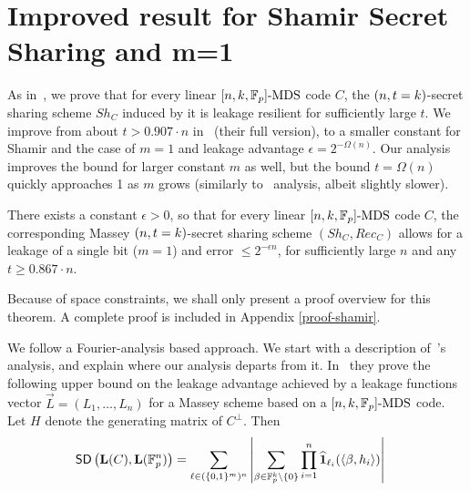 \chapter{Improved result for Shamir Secret Sharing and m=1}
\label{sec:shamir} 

As in~\cite{EPRINT:BDIR19}, we prove that for every linear $[n,k,\mathbb{F}_p]\text{-MDS}$ code $C$, the $(n,t=k)$-secret sharing scheme $Sh_C$ induced by it is leakage resilient for sufficiently large $t$.
We improve from about $t> 0.907\cdot n$ in~\cite{EPRINT:BDIR19} (their full version), to a smaller constant for Shamir and the case of $m=1$ and leakage advantage $\epsilon=2^{-\Omega(n)}$. Our analysis improves the bound for larger constant $m$ as well, but the bound $t=\Omega(n)$ quickly approaches 1 as $m$ grows (similarly to~\cite{EPRINT:BDIR19} analysis, albeit slightly slower).

\begin{theorem}
\label{shamir}
There exists a constant $\epsilon > 0$, so that for every linear $[n,k,\mathbb{F}_p]\text{-MDS}$ code $C$, the corresponding Massey $(n,t=k)$-secret sharing scheme $(Sh_C,Rec_C)$ allows for a leakage of a single bit ($m=1$) and error $\leq 2^{-\epsilon n}$, for sufficiently large $n$ and any $t \geq 0.867\cdot n$.
\end{theorem}

Because of space constraints, we shall only present a proof overview for this theorem.
A complete proof is included in Appendix \ref{proof-shamir}.

We follow a Fourier-analysis based approach. 
We start with a description of~\cite{EPRINT:BDIR19}'s analysis, and explain where our analysis departs from it.
In~\cite{EPRINT:BDIR19} they prove the following upper bound on the leakage advantage achieved by a leakage functions vector $\vec{L}=(L_1,\ldots,L_n)$ for a Massey scheme based on a $[n,k,\mathbb{F}_p]\text{-MDS}$ code. 
Let $H$ denote the generating matrix of $C^\bot$.
Then
\begin{align}\label{eq:start}
\mathsf{SD} \left({\mathbf{L}(C)},{\mathbf{L}(\mathbb{F}^n_p)} \right)&=\sum_{\mathbf{\ell}\in(\{0,1\}^m)^n}\left|\sum_{\beta\in \mathbb{F}^{k}_p\setminus{\{0\}}}\prod^n_{i=1}{\widehat{\mathbf{1}}}_{\ell_i}(\langle\beta,h_i\rangle)\right|
\end{align}    

